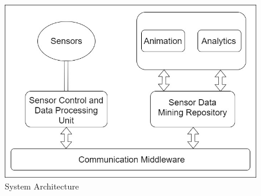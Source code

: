 \documentclass[11pt]{article}
\begin{document}
\begin{figure}[h!]
  \centering
  \hspace*{-1.25cm}   
\includegraphics[scale=0.34]{images/fig5.jpg}
  \hspace*{-1.25cm}
  \caption{System Architecture}
  \label{arch}
\end{figure}
\end{document}
